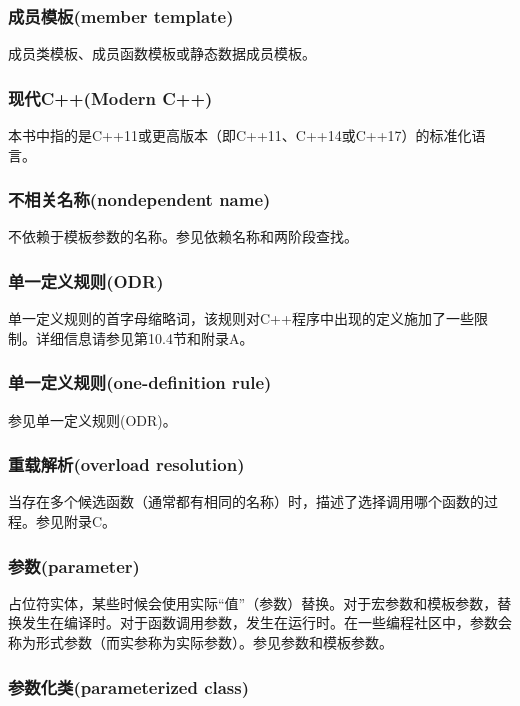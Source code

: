 \subsubsection{成员模板(member template)}

成员类模板、成员函数模板或静态数据成员模板。

\subsubsection{现代C++(Modern C++)}

本书中指的是C++11或更高版本（即C++11、C++14或C++17）的标准化语言。

\subsubsection{不相关名称(nondependent name)}

不依赖于模板参数的名称。参见依赖名称和两阶段查找。

\subsubsection{单一定义规则(ODR)}

单一定义规则的首字母缩略词，该规则对C++程序中出现的定义施加了一些限制。详细信息请参见第10.4节和附录A。

\subsubsection{单一定义规则(one-definition rule)}

参见单一定义规则(ODR)。

\subsubsection{重载解析(overload resolution)}

当存在多个候选函数（通常都有相同的名称）时，描述了选择调用哪个函数的过程。参见附录C。

\subsubsection{参数(parameter)}

占位符实体，某些时候会使用实际“值”（参数）替换。对于宏参数和模板参数，替换发生在编译时。对于函数调用参数，发生在运行时。在一些编程社区中，参数会称为形式参数（而实参称为实际参数）。参见参数和模板参数。

\subsubsection{参数化类(parameterized class)}

